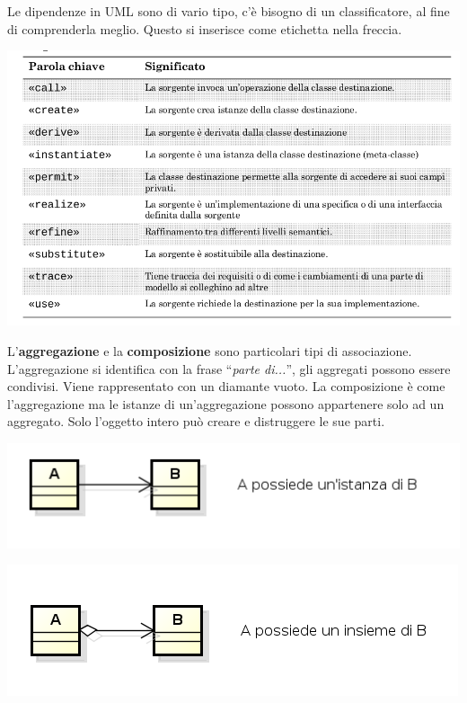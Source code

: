 Le dipendenze in UML sono di vario tipo, c'è bisogno di un classificatore, al fine di comprenderla meglio. Questo si inserisce come etichetta nella freccia.

\begin{center}

\includegraphics[width=0.75\columnwidth]{img10} %

\end{center}

L'\textbf{aggregazione} e la \textbf{composizione} sono particolari tipi di associazione. L'aggregazione si identifica con la frase ``\textit{parte di...}'', gli aggregati possono essere condivisi. Viene rappresentato con un diamante vuoto. La composizione è come l'aggregazione ma le istanze di un'aggregazione possono appartenere solo ad un aggregato. Solo l'oggetto intero può creare e distruggere le sue parti.

\begin{center}

\includegraphics[width=0.75\columnwidth]{img11} %

\end{center}

\begin{center}

\includegraphics[width=0.75\columnwidth]{img12} %

\end{center}

